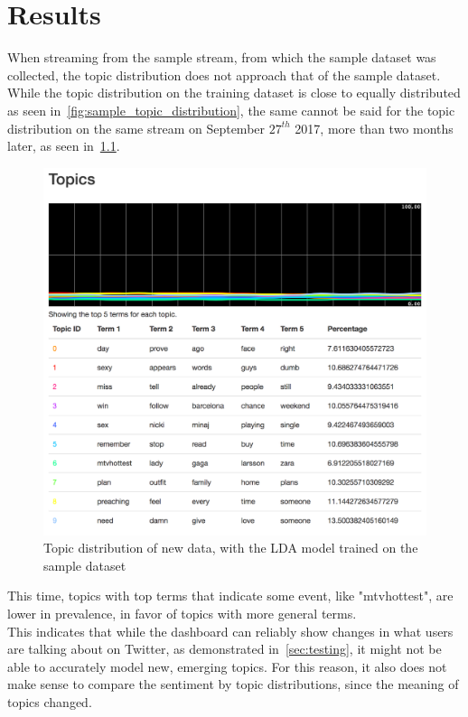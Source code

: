 \chapter{Results}
\label{ch:results}

When streaming from the sample stream, from which the sample dataset was collected,
the topic distribution does not approach that of the sample dataset.
While the topic distribution on the training dataset is close to equally distributed as seen in~\cref{fig:sample_topic_distribution},
the same cannot be said for the topic distribution on the same stream on September $27^{th}$ 2017, more than two months later,
as seen in~\cref{fig:sample_topic_distribtion_new}.

\begin{figure}
    \centering
    \caption{Topic distribution of new data, with the LDA model trained on the sample dataset}
    \label{fig:sample_topic_distribtion_new}
    \includegraphics[width=\textwidth]{../images/dashboard_topics_sample.png}
\end{figure}

This time, topics with top terms that indicate some event, like "mtvhottest", are lower in prevalence,
in favor of topics with more general terms.\\
This indicates that while the dashboard can reliably show changes in what users are talking about on Twitter,
as demonstrated in~\cref{sec:testing},
it might not be able to accurately model new, emerging topics.
For this reason, it also does not make sense to compare the sentiment by topic distributions,
since the meaning of topics changed.

